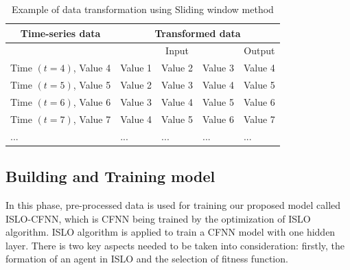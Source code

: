 \documentclass[a4paper,13pt,2p]{report}
\begin{document}
\begin{table}[!t]
\caption{Example of data transformation using Sliding window method}
\label{tbl_sliding_window}
\centering
\begin{tabular}{|p{4cm}|p{2cm}|p{2cm}|p{2cm}|p{2cm}|}
 \hline
 \multicolumn{1}{|c|}{Time-series data} & \multicolumn{4}{c|}{Transformed data} \\ 
 \hline
 \multicolumn{1}{|c}{} & \multicolumn{3}{|c}{Input} & \multicolumn{1}{|c|}{Output} \\
 \hline
  Time $(t=4)$, Value 4 & Value 1 & Value 2 & Value 3 & Value 4 \\
  Time $(t=5)$, Value 5 & Value 2 & Value 3 & Value 4 & Value 5 \\
  Time $(t=6)$, Value 6 & Value 3 & Value 4 & Value 5 & Value 6 \\
  Time $(t=7)$, Value 7 & Value 4 & Value 5 & Value 6 & Value 7 \\
 ... & ... & ... & ...  & ... \\
 \hline
\end{tabular}
\end{table}	
	 
\subsection{Building and Training model}
\label{main_model}

	In this phase, pre-processed data is used for training our proposed model called ISLO-CFNN, which is CFNN being trained by the optimization of ISLO algorithm. ISLO algorithm is applied to train a CFNN model with one hidden layer. There is two key aspects needed to be taken into consideration: firstly, the formation of an agent in ISLO and the selection of fitness function.
	
\end{document}
